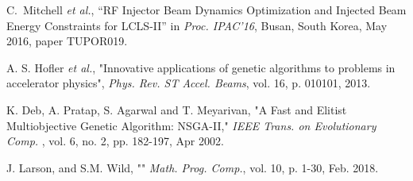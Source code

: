 \documentclass[letterpaper,  %
              ]{jacow-2_3}   %
\begin{document}
\begin{thebibliography}{99}
C.~Mitchell \emph{et al.}, “RF Injector Beam Dynamics Optimization 
and Injected Beam Energy Constraints for LCLS-II”
in \textit{Proc. IPAC’16}, 
Busan, South Korea, May 2016, 
paper TUPOR019.

A. S. Hofler \emph{et al.},
"Innovative applications of genetic algorithms to 
problems in accelerator physics",
\emph{Phys. Rev. ST Accel. Beams}, vol. 16,
p. 010101, 2013.


K. Deb, A. Pratap, S. Agarwal and T. Meyarivan, 
"A Fast and Elitist Multiobjective Genetic Algorithm: NSGA-II," 
\emph{IEEE Trans. on Evolutionary Comp.} , 
vol. 6, no. 2, pp. 182-197, Apr 2002.

J. Larson, and S.M. Wild, ""
\emph{Math. Prog. Comp.}, vol. 10, 
p. 1-30, Feb. 2018. 

\end{thebibliography}
\end{document}
